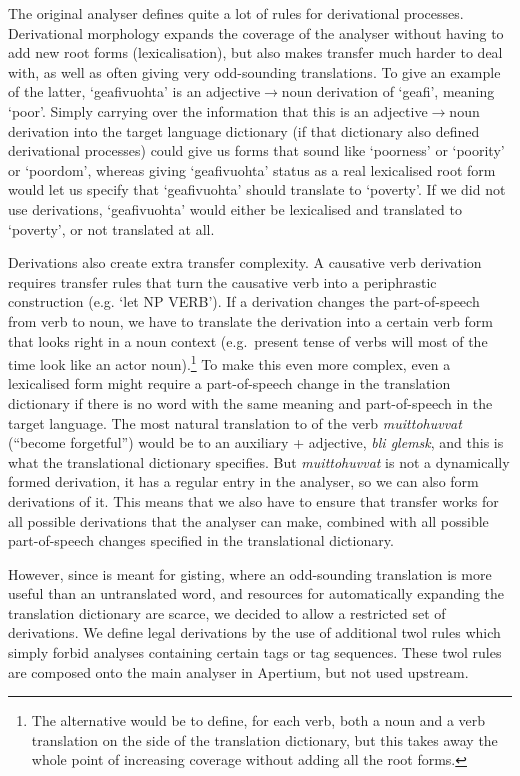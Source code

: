 \documentclass{book}
\begin{document}
The original analyser defines quite a lot of rules for derivational
processes. Derivational morphology expands the coverage of the
analyser without having to add new root forms (lexicalisation), but
also makes transfer much harder to deal with, as well as often giving
very odd-sounding translations.
To give an example of the latter, `geafivuohta' is an
adjective$\rightarrow{}$noun derivation of `geafi', meaning `poor'.
Simply carrying over the information that this is an
adjective$\rightarrow{}$noun derivation into the target language
dictionary (if that dictionary also defined derivational processes)
could give us forms that sound like `poorness' or `poority' or
`poordom', whereas giving `geafivuohta' status as a real lexicalised
root form would let us specify that `geafivuohta' should translate to
`poverty'. If we did not use derivations, `geafivuohta' would either
be lexicalised and translated to `poverty', or not translated at all.

Derivations also create extra transfer complexity. A causative verb
derivation requires transfer rules that turn the causative verb into a
periphrastic construction (e.g. `let NP VERB'). If a derivation
changes the part-of-speech from verb to noun, we have to translate the
derivation into a certain verb form that looks right in a noun context
(e.g.~present tense of \nob{} verbs will most of the time look like an
actor noun).\footnote{The alternative would be to define, for each
  \sme{} verb, both a noun and a verb translation on the \nob{} side
  of the translation dictionary, but this takes away the whole point
  of increasing coverage without adding all the root forms.} To make
this even more complex, even a lexicalised form might require a
part-of-speech change in the translation dictionary if there is no
word with the same meaning and part-of-speech in the target language.
The most natural translation to \nob{} of the verb
\textit{muittohuvvat} (``become forgetful'') would be to an auxiliary
+ adjective, \textit{bli glemsk}, and this is what the translational
dictionary specifies. But \textit{muittohuvvat} is not a dynamically
formed derivation, it has a regular entry in the analyser, so we can
also form derivations of it. This means that we also have to ensure
that transfer works for all possible derivations that the analyser can
make, combined with all possible part-of-speech changes specified in
the translational dictionary.

However, since \smenob{} is meant for gisting, where an odd-sounding
translation is more useful than an untranslated word, and resources
for automatically expanding the translation dictionary are scarce, we
decided to allow a restricted set of derivations. We define legal
derivations by the use of additional twol rules which simply forbid
analyses containing certain tags or tag sequences. These twol rules
are composed onto the main analyser in Apertium, but not used
upstream.
\end{document}
